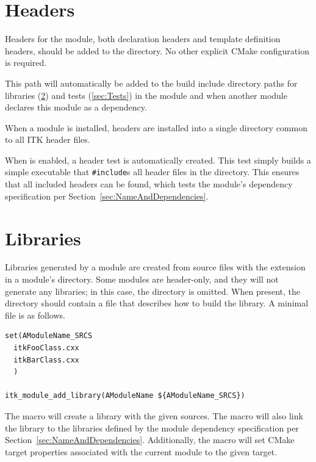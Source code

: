 \section{Headers}%
\label{sec:Headers}%

Headers for the module, both  declaration headers and 
template definition headers, should be added to the  directory.
No other explicit CMake configuration is required.

This path will automatically be added to the build include directory paths for
libraries (\ref{sec:Libraries}) and tests (\ref{sec:Tests}) in the module and when
another module declares this module as a dependency.

When a module is installed, headers are installed into a single
directory common to all ITK header files.

When  is enabled, a header test is automatically
created. This test simply builds a simple executable that \texttt{\#include}s
all header files in the  directory. This ensures that all
included headers can be found, which tests the module's dependency
specification per Section~\ref{sec:NameAndDependencies}.


\section{Libraries}%
\label{sec:Libraries}%

Libraries generated by a module are created from source files with the
 extension in a module's  directory. Some modules are
header-only, and they will not generate any libraries; in this case, the
 directory is omitted. When present, the  directory should
contain a  file that describes how to build the library.
A minimal  file is as follows.

\begin{verbatim}
set(AModuleName_SRCS
  itkFooClass.cxx
  itkBarClass.cxx
  )

itk_module_add_library(AModuleName ${AModuleName_SRCS})
\end{verbatim}

The  macro will create a library with the
given sources. The macro will also link the library to the
libraries defined by the module dependency
specification per Section~\ref{sec:NameAndDependencies}. Additionally, the
macro will set CMake target properties associated with the current module to
the given target.

